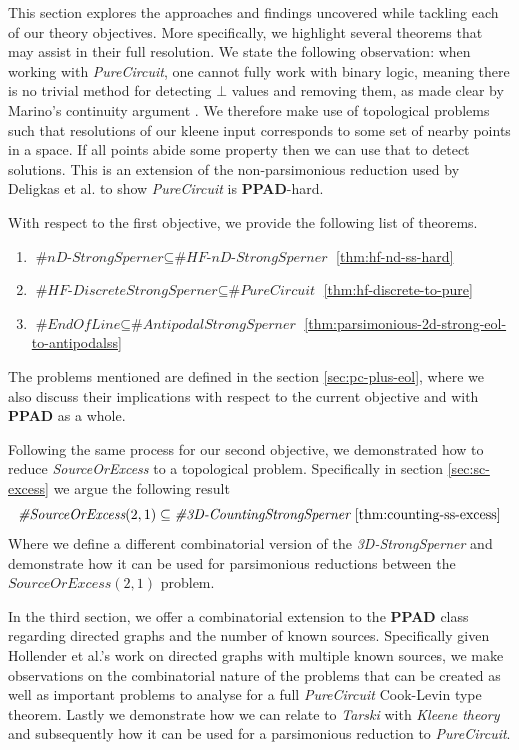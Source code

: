 This section explores the approaches and findings uncovered while
tackling each of our theory objectives. More specifically,
we highlight several theorems
that may assist in their full resolution.
We state the following observation:
when working with \textit{PureCircuit}, one cannot fully work with binary logic, meaning
there is no trivial method for detecting $\bot$ values and removing them, as made clear by
Marino's continuity argument \cite{marino_GeneralTheoryMetastable_1981}.
We therefore make use of topological problems such that resolutions of our kleene input
corresponds to some set of nearby points in a space. If all points abide some property
then we can use that to detect solutions.
This is an extension of the non-parsimonious reduction used by Deligkas
et al. \cite{deligkas_PureCircuitTightInapproximability_2024} to show \textit{PureCircuit} is \textbf{PPAD}-hard.


With respect to the first objective, we provide the following
list of theorems.
\begin{enumerate}
    \item $\textit{\#nD-StrongSperner} \subseteq \textit{\#HF-nD-StrongSperner}$ \ref{thm:hf-nd-ss-hard}
    \item $\textit{\#HF-DiscreteStrongSperner} \subseteq \textit{\#PureCircuit}$ \ref{thm:hf-discrete-to-pure}
    \item $\textit{\#EndOfLine} \subseteq \textit{\#AntipodalStrongSperner}$ \ref{thm:parsimonious-2d-strong-eol-to-antipodalss}
\end{enumerate}
The problems mentioned are defined in the section \ref{sec:pc-plus-eol}, where
we also discuss their implications with respect to the current objective
and with \textbf{PPAD} as a whole.

Following the same process for our second objective, we demonstrated how to reduce \textit{SourceOrExcess}
to a topological problem. Specifically in section \ref{sec:sc-excess} we argue the following result
$$
    \textit{\#SourceOrExcess}(2,1) \subseteq \textit{\#3D-CountingStrongSperner} \text{ \ref{thm:counting-ss-excess}}
$$
Where we define a different combinatorial version of the \textit{3D-StrongSperner} and demonstrate
how it can be used for parsimonious reductions between the $\textit{SourceOrExcess}(2,1)$ problem.


In the third section, we offer a combinatorial extension to the \textbf{PPAD} class
regarding directed graphs and the number of known sources. Specifically
given Hollender et al.'s work \cite{hollender_ComplexityMultisourceVariants_2018}
on directed graphs with multiple known sources, we make
observations on the combinatorial nature of the problems that can be created
as well as important problems to analyse for a full \textit{PureCircuit} Cook-Levin type theorem.
Lastly we demonstrate how we can relate to \textit{Tarski} with \textit{Kleene theory} and
subsequently how it can be used for a parsimonious reduction to \textit{PureCircuit}.
